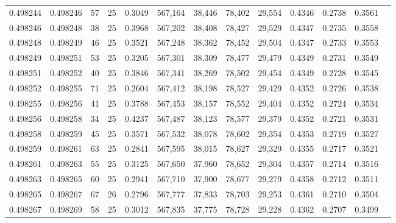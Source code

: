 \begin{tabular}{rrrrrrrrrrrrr}
0.498244 & 0.498246 &    57 &  25 &                                     0.3049 & 567,164 &  38,446 &  78,402 &  29,554 & 0.4346 & 0.2738 & 0.3561 \\
0.498246 & 0.498248 &    38 &  25 &                                     0.3968 & 567,202 &  38,408 &  78,427 &  29,529 & 0.4347 & 0.2735 & 0.3558 \\
0.498248 & 0.498249 &    46 &  25 &                                     0.3521 & 567,248 &  38,362 &  78,452 &  29,504 & 0.4347 & 0.2733 & 0.3553 \\
0.498249 & 0.498251 &    53 &  25 &                                     0.3205 & 567,301 &  38,309 &  78,477 &  29,479 & 0.4349 & 0.2731 & 0.3549 \\
0.498251 & 0.498252 &    40 &  25 &                                     0.3846 & 567,341 &  38,269 &  78,502 &  29,454 & 0.4349 & 0.2728 & 0.3545 \\
0.498252 & 0.498255 &    71 &  25 &                                     0.2604 & 567,412 &  38,198 &  78,527 &  29,429 & 0.4352 & 0.2726 & 0.3538 \\
0.498255 & 0.498256 &    41 &  25 &                                     0.3788 & 567,453 &  38,157 &  78,552 &  29,404 & 0.4352 & 0.2724 & 0.3534 \\
0.498256 & 0.498258 &    34 &  25 &                                     0.4237 & 567,487 &  38,123 &  78,577 &  29,379 & 0.4352 & 0.2721 & 0.3531 \\
0.498258 & 0.498259 &    45 &  25 &                                     0.3571 & 567,532 &  38,078 &  78,602 &  29,354 & 0.4353 & 0.2719 & 0.3527 \\
0.498259 & 0.498261 &    63 &  25 &                                     0.2841 & 567,595 &  38,015 &  78,627 &  29,329 & 0.4355 & 0.2717 & 0.3521 \\
0.498261 & 0.498263 &    55 &  25 &                                     0.3125 & 567,650 &  37,960 &  78,652 &  29,304 & 0.4357 & 0.2714 & 0.3516 \\
0.498263 & 0.498265 &    60 &  25 &                                     0.2941 & 567,710 &  37,900 &  78,677 &  29,279 & 0.4358 & 0.2712 & 0.3511 \\
0.498265 & 0.498267 &    67 &  26 &                                     0.2796 & 567,777 &  37,833 &  78,703 &  29,253 & 0.4361 & 0.2710 & 0.3504 \\
0.498267 & 0.498269 &    58 &  25 &                                     0.3012 & 567,835 &  37,775 &  78,728 &  29,228 & 0.4362 & 0.2707 & 0.3499 \\

\end{tabular}
